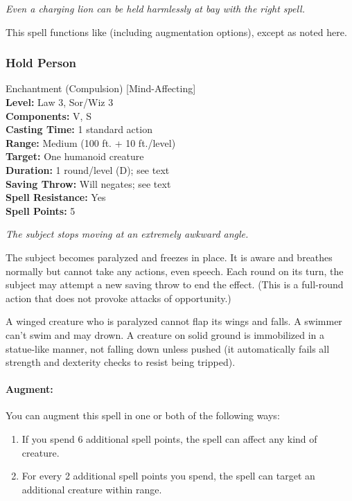 \emph{Even a charging lion can be held harmlessly at bay with the right spell.}

This spell functions like  (including augmentation options), except as noted here.
\subsubsection{Hold Person}
\label{Spell:HoldPerson}
Enchantment (Compulsion) [Mind-Affecting]
\\ \textbf{Level:} Law 3, Sor/Wiz 3
\\ \textbf{Components:} V, S
\\ \textbf{Casting Time:} 1 standard action
\\ \textbf{Range:} Medium (100 ft. + 10 ft./level)
\\ \textbf{Target:} One humanoid creature
\\ \textbf{Duration:} 1 round/level (D); see text
\\ \textbf{Saving Throw:} Will negates; see text
\\ \textbf{Spell Resistance:} Yes
\\ \textbf{Spell Points:} 5

\emph{The subject stops moving at an extremely awkward angle.}

The subject becomes paralyzed and freezes in place.
It is aware and breathes normally but cannot take any actions, even speech. 
Each round on its turn, the subject may attempt a new saving throw to end the effect. 
(This is a full-round action that does not provoke attacks of opportunity.)

A winged creature who is paralyzed cannot flap its wings and falls. A swimmer can't swim and may drown.
A creature on solid ground is immobilized in a statue-like manner, not falling down unless pushed (it automatically fails all strength and dexterity checks to resist being tripped).

\paragraph{Augment:} You can augment this spell in one or both of the following ways:
\begin{enumerate}
 \item If you spend 6 additional spell points, the spell can affect any kind of creature.
 \item For every 2 additional spell points you spend, the spell can target an additional creature within range.
\end{enumerate}

